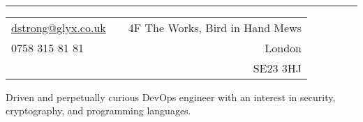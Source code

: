 \documentclass[a4paper,10pt]{article} %
\begin{document}
\pagestyle{empty} %


\\ %
\medskip
\hrule
\footnotesize{
\begin{tabularx}{\textwidth}{lXr}
\href{mailto:dstrong@glyx.co.uk}{dstrong@glyx.co.uk} & & {4F The Works, Bird in Hand Mews}\\
{0758 315 81 81}                                     & & {London}\\ 
                                                     & & {SE23 3HJ}
\end{tabularx}
}

\medskip
\begin{flushleft}
Driven and perpetually curious DevOps engineer with an interest in security, cryptography, and programming languages.
\end{flushleft}

\end{document}

